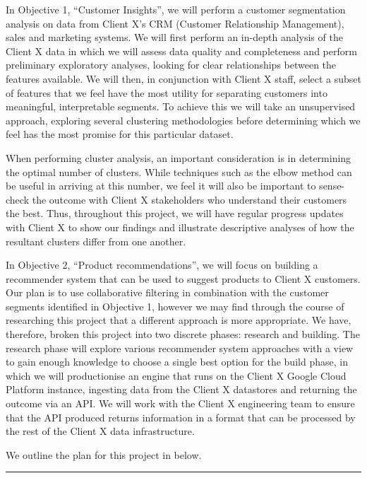 \documentclass[
]{book}
\begin{document}
In Objective 1, ``Customer Insights'', we will perform a customer
segmentation analysis on data from Client X's CRM (Customer Relationship
Management), sales and marketing systems. We will first perform an
in-depth analysis of the Client X data in which we will assess data
quality and completeness and perform preliminary exploratory analyses,
looking for clear relationships between the features available. We will
then, in conjunction with Client X staff, select a subset of features
that we feel have the most utility for separating customers into
meaningful, interpretable segments. To achieve this we will take an
unsupervised approach, exploring several clustering methodologies before
determining which we feel has the most promise for this particular
dataset.

When performing cluster analysis, an important consideration is in
determining the optimal number of clusters. While techniques such as the
elbow method can be useful in arriving at this number, we feel it will
also be important to sense-check the outcome with Client X stakeholders
who understand their customers the best. Thus, throughout this project,
we will have regular progress updates with Client X to show our findings
and illustrate descriptive analyses of how the resultant clusters differ
from one another.

In Objective 2, ``Product recommendations'', we will focus on building a
recommender system that can be used to suggest products to Client X
customers. Our plan is to use collaborative filtering in combination
with the customer segments identified in Objective 1, however we may
find through the course of researching this project that a different
approach is more appropriate. We have, therefore, broken this project
into two discrete phases: research and building. The research phase will
explore various recommender system approaches with a view to gain enough
knowledge to choose a single best option for the build phase, in which
we will productionise an engine that runs on the Client X Google Cloud
Platform instance, ingesting data from the Client X datastores and
returning the outcome via an API. We will work with the Client X
engineering team to ensure that the API produced returns information in
a format that can be processed by the rest of the Client X data
infrastructure.

We outline the plan for this project in below.

\begin{center}\rule{0.5\linewidth}{0.5pt}\end{center}
\end{document}
